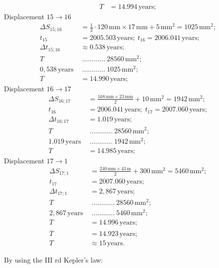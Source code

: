 \begin{description}
\begin{align*}
    T &= 14.994\,\mathrm{years};
  \end{align*}
  Displacement $15 \rightarrow 16$
  \begin{align*}
    \Delta S_{15;16} &= \frac{1}{2}\cdot120\,\mathrm{mm}\times17\,\mathrm{mm}
      + 5\,\mathrm{mm}^2 = 1025\,\mathrm{mm}^2;\\
    t_{15} &= 2005.503\,\mathrm{years};\; t_{16} = 2006.041\,\mathrm{years};\\
    \Delta t_{15;16} &\approx 0.538\,\mathrm{years};\\
    T\ &\ \dots\dots\dots\dots\ 28560\,\mathrm{mm}^2;\\
    0{,}538\,\mathrm{years}\ &\ \dots\dots\dots\dots\ 1025\,\mathrm{mm}^2;\\
    T &= 14.990\,\mathrm{years};
  \end{align*}
  Displacement $16 \rightarrow 17$
  \begin{align*}
    \Delta S_{16;17} &= \frac{168\,\mathrm{mm}\times23\,\mathrm{mm}}{2}
      + 10\,\mathrm{mm}^2 = 1942\,\mathrm{mm}^2;\\
    t_{16} &= 2006.041\,\mathrm{years};\; t_{17} = 2007.060\,\mathrm{years};\\
    \Delta t_{16;17} &= 1.019\,\mathrm{years};\\
    T\ &\ \dots\dots\dots\dots\ 28560\,\mathrm{mm}^2;\\
    1.019\,\mathrm{years}\ &\ \dots\dots\dots\dots\ 1942\,\mathrm{mm}^2;\\
    T &= 14.985\,\mathrm{years};
  \end{align*}
  Displacement $17 \rightarrow 1$
  \begin{align*}
    \Delta S_{17;1} &= \frac{240\,\mathrm{mm}\times43\,\mathrm{m}}{2}
      + 300\,\mathrm{mm}^2 = 5460\,\mathrm{mm}^2;\\
    t_{17} &= 2007.060\,\mathrm{years};\\
    \Delta t_{17;1} &= 2{,}867\,\mathrm{years};\\
    T\ &\ \dots\dots\dots\dots\ 28560\,\mathrm{mm}^2;\\
    2{,}867\,\mathrm{years}\ &\ \dots\dots\dots\dots\ 5460\,\mathrm{mm}^2;\\
    T &= 14.996\,\mathrm{years};\\
    \overline{T} &= 14.923\,\mathrm{years};\\
    T &\approx 15\,\mathrm{years}.
  \end{align*}
\item[c)] By using the III rd Kepler's law:

\end{description}
